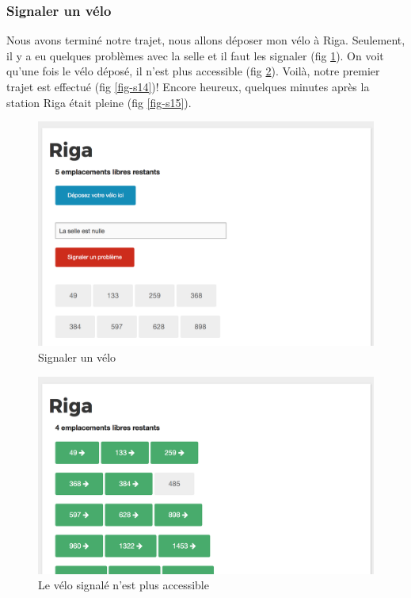 \documentclass[a4paper]{article}
\begin{document}
    \subsubsection{Signaler un vélo}
    Nous avons terminé notre trajet, nous allons déposer mon vélo à Riga. Seulement, il y a eu quelques problèmes avec la selle et il faut les signaler (fig \ref{fig-s12}). On voit qu'une fois le vélo déposé, il n'est plus accessible (fig \ref{fig-s13}). Voilà, notre premier trajet est effectué (fig \ref{fig-s14})! Encore heureux, quelques minutes après la station Riga était pleine (fig \ref{fig-s15}).
    
    \begin{figure}
    \includegraphics[width=\textwidth]{images/s12.png}
    \caption{Signaler un vélo}
    \label{fig-s12}
    \end{figure}
    
    \begin{figure}
    \includegraphics[width=\textwidth]{images/s13.png}
    \caption{Le vélo signalé n'est plus accessible}
    \label{fig-s13}
    \end{figure}
    
\end{document}
